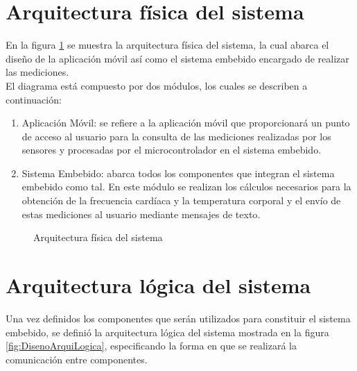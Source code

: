 \newpage
\section{Arquitectura física del sistema}
En la figura \ref{fig:DisenoArquiFisica} se muestra la arquitectura física del sistema, la cual abarca el diseño de la aplicación móvil así como el sistema embebido encargado de realizar las mediciones.\\

El diagrama está compuesto por dos módulos, los cuales se describen a continuación:
\begin{enumerate}
	\item Aplicación Móvil: se refiere a la aplicación móvil que proporcionará un punto de acceso al usuario para la consulta de las mediciones realizadas por los sensores y procesadas por el microcontrolador en el sistema embebido. 
	\item Sistema Embebido: abarca todos los componentes que integran el sistema embebido como tal. En este módulo se realizan los cálculos necesarios para la obtención de la frecuencia cardíaca y la temperatura corporal y el envío de estas mediciones al usuario mediante mensajes de texto.
\end{enumerate}

\begin{figure}[htbp!]
	\centering
	\caption{Arquitectura física del sistema}
	\label{fig:DisenoArquiFisica}
\end{figure}
\clearpage

\section{Arquitectura lógica del sistema}
Una vez definidos los componentes que serán utilizados para constituir el sistema embebido, se definió la arquitectura lógica del sistema mostrada en la figura \ref{fig:DisenoArquiLogica}, especificando la forma en que se realizará la comunicación entre componentes.\\

